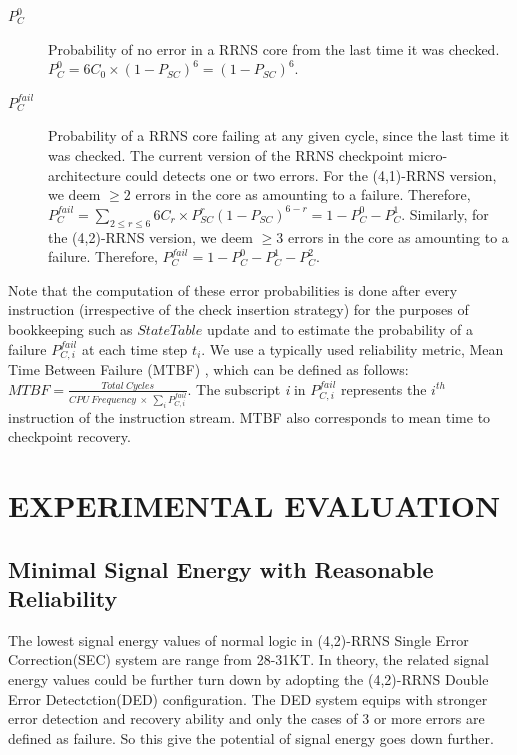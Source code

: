 \documentclass{sig-alternate}
\begin{document}
\begin{description}
\item[$P_C^{0}$]
Probability of no error in a RRNS core from the last time it was checked. $P_C^{0}=6C_0 \times (1-P_{SC})^6 = (1-P_{SC})^6$.

\item[$P_C^{fail}$]
Probability of a RRNS core failing at any given cycle, since the last time it was checked. The current version of the RRNS checkpoint micro-architecture could detects one or two errors. For the (4,1)-RRNS version, we deem $\geq 2$ errors in the core as amounting to a failure. Therefore, $P_C^{fail}=\sum_{2\leq r\leq 6} 6C_r\times P_{SC}^r(1-P_{SC})^{6-r}=1-P_C^0-P_C^1$.  Similarly, for the (4,2)-RRNS version, we deem $\geq 3$ errors in the core as amounting to a failure. Therefore, $P_C^{fail}=1-P_C^0-P_C^1-P_C^2$. 

\end{description}

Note that the computation of these error probabilities is done after every instruction (irrespective of the check insertion strategy) for the purposes of bookkeeping such as $StateTable$ update and to estimate the probability of a failure $P_{C, i}^{fail}$ at each time step $t_i$. We use a typically used reliability metric, Mean Time Between Failure (MTBF) \cite{tan2004process}, which can be defined as follows: $MTBF=\frac{Total~Cycles}{CPU~Frequency~\times~\sum_iP_{C, i}^{fail}}$. The subscript \textit{i} in $P_{C, i}^{fail}$ represents the ${i}^{th}$ instruction of the instruction stream. MTBF also corresponds to mean time to checkpoint recovery. 


\section{EXPERIMENTAL EVALUATION}
\label{Evaluation}

\subsection{Minimal Signal Energy with Reasonable Reliability}
\label{sub:SignalEnergy}
The lowest signal energy values of normal logic in (4,2)-RRNS Single Error Correction(SEC) system are range from 28-31KT\cite{DengTACO18}. In theory, the related signal energy values could be further turn down by adopting the (4,2)-RRNS Double Error Detectction(DED) configuration. The DED system equips with stronger error detection and recovery ability and only the cases of 3 or more errors are defined as failure. So this give the potential of signal energy goes down further. 
\end{document}
